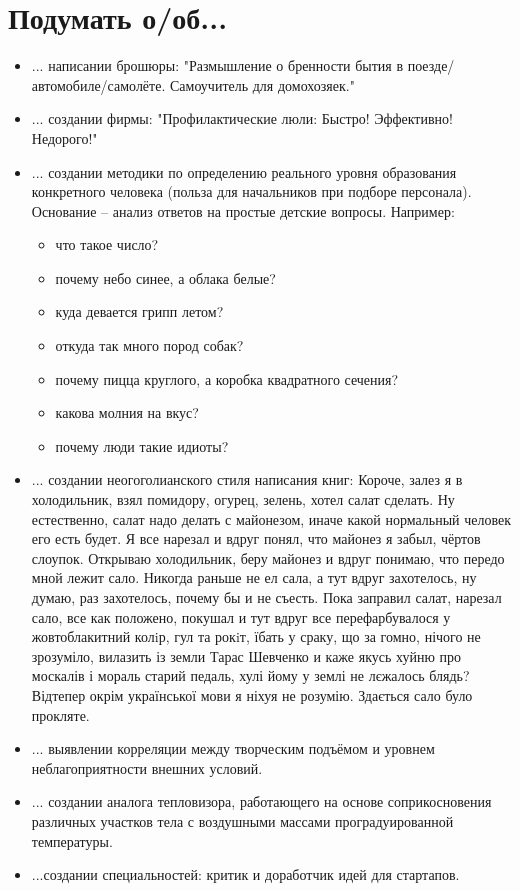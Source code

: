 \section{Подумать о/об...}
\begin{itemize}
\item ... написании брошюры: "Размышление о бренности бытия в поезде/автомобиле/самолёте. Самоучитель для домохозяек."
\item ... создании фирмы: "Профилактические люли: Быстро! Эффективно! Недорого!"
\item ...  создании методики по определению реального уровня образования конкретного человека (польза для начальников при подборе персонала). Основание -- анализ ответов на простые детские вопросы.
Например:
    \begin{itemize}
        \item что такое число?
        \item почему небо синее, а облака белые?
        \item куда девается грипп летом?
        \item откуда так много пород собак?
        \item почему пицца круглого, а коробка квадратного сечения?
        \item какова молния на вкус?
        \item почему люди такие идиоты?
    \end{itemize}
\item ... создании неогоголианского стиля написания книг:
    Короче, залез я в холодильник, взял помидору, огурец, зелень, хотел салат сделать. Ну естественно, салат надо делать с майонезом, иначе
    какой нормальный человек его есть будет. Я все нарезал и вдруг понял, что майонез я забыл, чёртов слоупок. Открываю холодильник, беру
    майонез и вдруг понимаю, что передо мной лежит сало. Никогда раньше не ел сала, а тут вдруг захотелось, ну думаю, раз захотелось, почему
    бы и не съесть. Пока заправил салат, нарезал сало, все как положено, покушал и тут вдруг все перефарбувалося у жовтоблакитний колiр, гул
    та рокiт, їбать у сраку, що за гомно, нічого не зрозуміло, вилазить із земли Тарас Шевченко и каже якусь хуйню про москалів і мораль
    старий педаль, хулі йому у землі не лєжалось блядь? Відтепер окрім української мови я ніхуя не розумію. Здається сало було прокляте.
\item ... выявлении корреляции между творческим подъёмом и уровнем неблагоприятности внешних условий.
\item ... создании аналога тепловизора, работающего на основе соприкосновения различных участков тела с воздушными массами проградуированной температуры.
\item ...создании специальностей: критик и доработчик идей для стартапов.
\end{itemize}